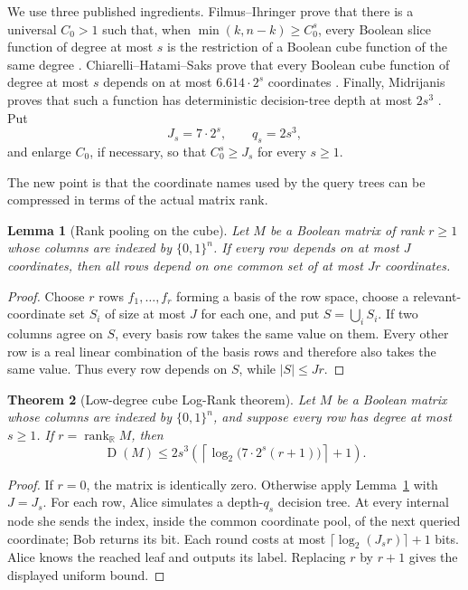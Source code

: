 \documentclass[11pt]{article}
\newtheorem{theorem}{Theorem}[section]
\newtheorem{lemma}[theorem]{Lemma}
\theoremstyle{definition}
\theoremstyle{remark}
\newcommand{\R}{\mathbb R}
\newcommand{\1}{\mathbf 1}
\newcommand{\rank}{\operatorname{rank}}
\newcommand{\Dcc}{\operatorname{D}}
\begin{document}
We use three published ingredients.  Filmus--Ihringer prove that there is a
universal $C_0>1$ such that, when
$\min(k,n-k)\ge C_0^s$, every Boolean slice function of degree at most $s$
is the restriction of a Boolean cube function of the same degree
\cite{FilmusIhringerJunta}.  Chiarelli--Hatami--Saks prove that every Boolean
cube function of degree at most $s$ depends on at most
$6.614\cdot2^s$ coordinates \cite{ChiarelliHatamiSaks}.  Finally, Midrijanis
proves that such a function has deterministic decision-tree depth at most
$2s^3$ \cite{Midrijanis}.  Put
\[
 J_s=7\cdot2^s,
 \qquad q_s=2s^3,
\]
and enlarge $C_0$, if necessary, so that $C_0^s\ge J_s$ for every $s\ge1$.

The new point is that the coordinate names used by the query trees can be
compressed in terms of the actual matrix rank.

\begin{lemma}[Rank pooling on the cube]
\label{lem:cube-rank-pooling}
Let $M$ be a Boolean matrix of rank $r\ge1$ whose columns are indexed by
$\{0,1\}^n$.  If every row depends on at most $J$ coordinates, then all rows
depend on one common set of at most $Jr$ coordinates.
\end{lemma}

\begin{proof}
Choose $r$ rows $f_1,\ldots,f_r$ forming a basis of the row space, choose a
relevant-coordinate set $S_i$ of size at most $J$ for each one, and put
$S=\bigcup_iS_i$.  If two columns agree on $S$, every basis row takes the same
value on them.  Every other row is a real linear combination of the basis
rows and therefore also takes the same value.  Thus every row depends on
$S$, while $|S|\le Jr$.
\end{proof}

\begin{theorem}[Low-degree cube Log-Rank theorem]
\label{thm:low-degree-cube}
Let $M$ be a Boolean matrix whose columns are indexed by $\{0,1\}^n$, and
suppose every row has degree at most $s\ge1$.  If
$r=\rank_{\R}M$, then
\[
 \Dcc(M)\le
 2s^3\left(
 \left\lceil\log_2\bigl(7\cdot2^s(r+1)\bigr)\right\rceil+1
 \right).
\]
\end{theorem}

\begin{proof}
If $r=0$, the matrix is identically zero.  Otherwise apply
Lemma~\ref{lem:cube-rank-pooling} with $J=J_s$.  For each row, Alice simulates
a depth-$q_s$ decision tree.  At every internal node she sends the index,
inside the common coordinate pool, of the next queried coordinate; Bob
returns its bit.  Each round costs at most
$\lceil\log_2(J_sr)\rceil+1$ bits.  Alice knows the reached leaf and outputs
its label.  Replacing $r$ by $r+1$ gives the displayed uniform bound.
\end{proof}
\end{document}
